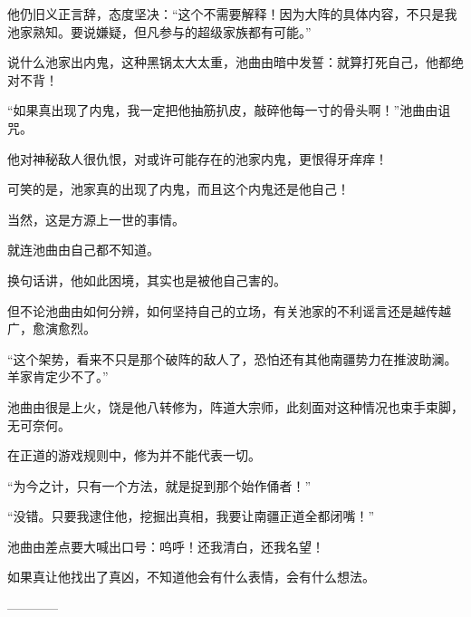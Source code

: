 \begin{this_body}
他仍旧义正言辞，态度坚决：“这个不需要解释！因为大阵的具体内容，不只是我池家熟知。要说嫌疑，但凡参与的超级家族都有可能。”

说什么池家出内鬼，这种黑锅太大太重，池曲由暗中发誓：就算打死自己，他都绝对不背！

“如果真出现了内鬼，我一定把他抽筋扒皮，敲碎他每一寸的骨头啊！”池曲由诅咒。

他对神秘敌人很仇恨，对或许可能存在的池家内鬼，更恨得牙痒痒！

可笑的是，池家真的出现了内鬼，而且这个内鬼还是他自己！

当然，这是方源上一世的事情。

就连池曲由自己都不知道。

换句话讲，他如此困境，其实也是被他自己害的。

但不论池曲由如何分辨，如何坚持自己的立场，有关池家的不利谣言还是越传越广，愈演愈烈。

“这个架势，看来不只是那个破阵的敌人了，恐怕还有其他南疆势力在推波助澜。羊家肯定少不了。”

池曲由很是上火，饶是他八转修为，阵道大宗师，此刻面对这种情况也束手束脚，无可奈何。

在正道的游戏规则中，修为并不能代表一切。

“为今之计，只有一个方法，就是捉到那个始作俑者！”

“没错。只要我逮住他，挖掘出真相，我要让南疆正道全都闭嘴！”

池曲由差点要大喊出口号：呜呼！还我清白，还我名望！

如果真让他找出了真凶，不知道他会有什么表情，会有什么想法。

------------

\end{this_body}

